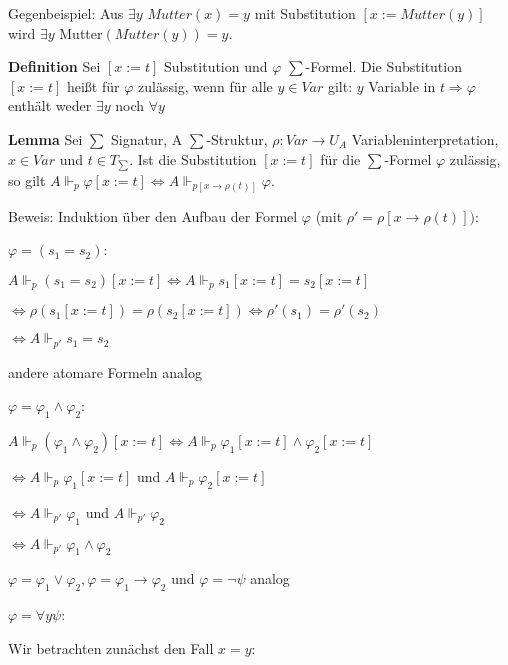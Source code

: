 \documentclass[a4paper]{article}
\renewcommand{\note}[2]{\begin{noteBox} \textbf{#1} #2 \end{noteBox}}
\begin{document}
\begin{multicols}{3}
  Gegenbeispiel: Aus $\exists y$ $Mutter(x) =y$ mit Substitution $[x:=Mutter(y)]$ wird $\exists y$ Mutter$(Mutter(y)) =y$.

  \note{Definition}{Sei $[x:=t]$ Substitution und $\varphi$ $\sum$-Formel. Die Substitution $[x:=t]$ heißt für $\varphi$ zulässig, wenn für alle $y\in Var$ gilt: $y$ Variable in $t\Rightarrow\varphi$ enthält weder $\exists y$ noch $\forall y$}

  \note{Lemma}{Sei $\sum$ Signatur, A $\sum$-Struktur, $\rho:Var\rightarrow U_A$ Variableninterpretation, $x\in Var$ und $t\in T_{\sum}$. Ist die Substitution $[x:=t]$ für die $\sum$-Formel $\varphi$ zulässig, so gilt $A\Vdash_p\varphi [x:=t]\Leftrightarrow  A\Vdash_{p[x\rightarrow \rho(t)]}\varphi$.}

  Beweis: Induktion über den Aufbau der Formel $\varphi$ (mit $\rho'=\rho[x\rightarrow \rho(t)])$:
  \begin{itemize*}
    \item $\varphi = (s_1 =s_2)$:
    \begin{itemize*}
      \item $A\Vdash_p(s_1 =s_2)[x:=t] \Leftrightarrow A\Vdash_p s_1[x:=t] =s_2[x:=t]$
      \item $\Leftrightarrow \rho(s_1[x:=t]) =\rho(s_2[x:=t])\Leftrightarrow \rho'(s_1) =\rho'(s_2)$
      \item $\Leftrightarrow A\Vdash_{p'} s_1 =s_2$
      \item andere atomare Formeln analog
    \end{itemize*}
    \item $\varphi =\varphi_1\wedge\varphi_2$:
    \begin{itemize*}
      \item $A\Vdash_p(\varphi_1\wedge\varphi_2)[x:=t] \Leftrightarrow A\Vdash_p\varphi_1 [x:=t]\wedge\varphi_2[x:=t]$
      \item $\Leftrightarrow A\Vdash_p\varphi_1[x:=t]$ und $A\Vdash_p\varphi_2[x:=t]$
      \item $\Leftrightarrow A\Vdash_{p'}\varphi_1$ und $A\Vdash_{p'}\varphi_2$
      \item $\Leftrightarrow A\Vdash_{p'}\varphi_1\wedge\varphi_2$
      \item $\varphi=\varphi_1\vee\varphi_2,\varphi =\varphi_1\rightarrow\varphi_2$ und $\varphi=\lnot\psi$ analog
    \end{itemize*}
    \item $\varphi=\forall y\psi$:
    \begin{itemize*}
      \item Wir betrachten zunächst den Fall $x=y$:

\end{itemize*}
\end{itemize*}
\end{multicols}
\end{document}
